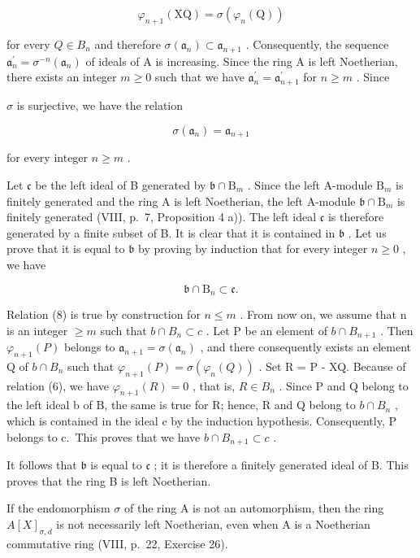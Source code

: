 \[
\varphi_ {n + 1} (\mathrm{XQ}) = \sigma (\varphi_ {n} (\mathrm{Q}))\tag{6}
\]

for every \(Q \in B_{n}\) and therefore \(\sigma(\mathfrak{a}_{n}) \subset \mathfrak{a}_{n+1}\) . Consequently, the sequence \(\mathfrak{a}_{n}^{\prime} = \sigma^{-n}(\mathfrak{a}_{n})\) of ideals of A is increasing. Since the ring A is left Noetherian, there exists an integer \(m \geqslant 0\) such that we have \(\mathfrak{a}_{n}^{\prime} = \mathfrak{a}_{n+1}^{\prime}\) for \(n \geqslant m\) . Since

\(\sigma\) is surjective, we have the relation

\[
\sigma (\mathfrak {a} _ {n}) = \mathfrak {a} _ {n + 1}\tag{7}
\]

for every integer \(n \geqslant m\) .

Let \(\mathfrak{c}\) be the left ideal of B generated by \(\mathfrak{b} \cap \mathrm{B}_m\) . Since the left A-module \(\mathrm{B}_m\) is finitely generated and the ring A is left Noetherian, the left A-module \(\mathfrak{b} \cap \mathrm{B}_m\) is finitely generated (VIII, p.~7, Proposition 4 a)). The left ideal \(\mathfrak{c}\) is therefore generated by a finite subset of B. It is clear that it is contained in \(\mathfrak{b}\) . Let us prove that it is equal to \(\mathfrak{b}\) by proving by induction that for every integer \(n \geqslant 0\) , we have

\[
\mathfrak {b} \cap \mathrm{B} _ {n} \subset \mathfrak {c}.\tag{8}
\]

Relation (8) is true by construction for \(n \leqslant m\) . From now on, we assume that n is an integer \(\geqslant m\) such that \(b \cap B_{n} \subset c\) . Let P be an element of \(b \cap B_{n+1}\) . Then \(\varphi_{n+1}(P)\) belongs to \(\mathfrak{a}_{n+1} = \sigma(\mathfrak{a}_{n})\) , and there consequently exists an element Q of \(b \cap B_{n}\) such that \(\varphi_{n+1}(P) = \sigma(\varphi_{n}(Q))\) . Set R = P - XQ. Because of relation (6), we have \(\varphi_{n+1}(R) = 0\) , that is, \(R \in B_{n}\) . Since P and Q belong to the left ideal b of B, the same is true for R; hence, R and Q belong to \(b \cap B_{n}\) , which is contained in the ideal c by the induction hypothesis. Consequently, P belongs to c.~This proves that we have \(b \cap B_{n+1} \subset c\) .

It follows that \(\mathfrak{b}\) is equal to \(\mathfrak{c}\) ; it is therefore a finitely generated ideal of B. This proves that the ring B is left Noetherian.

If the endomorphism \(\sigma\) of the ring A is not an automorphism, then the ring \(A[X]_{\sigma,d}\) is not necessarily left Noetherian, even when A is a Noetherian commutative ring (VIII, p.~22, Exercise 26).

